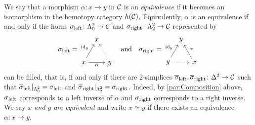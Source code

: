 \begin{numpar}\label{par:Equivalence}
	We say that a morphism $\alpha\colon x\rightarrow y$ in $\mathcal{C}$ is an \emph{equivalence} if it becomes an isomorphism in the homotopy category $h(\mathcal{C})$. Equivalently, $\alpha$ is an equivalence if and only if the horns $\sigma_\mathrm{left}\colon\Lambda_0^2\rightarrow\mathcal{C}$ and $\sigma_\mathrm{right}\colon\Lambda_2^2\rightarrow \mathcal{C}$ represented by\label{enum:Equivalence}
	\begin{equation*}
		\sigma_\mathrm{left}=\begin{tikzpicture}[commutative diagrams/every diagram,baseline=(mid.base)]
			\path node[outer sep=0.25ex] (0) at (0,0) {$x$} ++(0:3.8em) node[text depth=0pt,outer sep=0.25ex] (1) {$y$} ++ (120:3.8em) node[outer sep=0.25ex] (2) {$x$};
			\path (0) to node[pos=0.5] (mid) {} (2);
			\path[commutative diagrams/.cd, every arrow, every label]
			(0) edge node[swap] {$\alpha$} (1)
			(1) edge[dotted] (2)
			(0) edge node {$\id_y$} (2);
		\end{tikzpicture}
		\quad\text{and}\quad
		\sigma_\mathrm{right}=\begin{tikzpicture}[commutative diagrams/every diagram,baseline=(mid.base)]
			\path node[outer sep=0.25ex] (0) at (0,0) {$y$} ++(0:3.8em) node[text depth=0pt,outer sep=0.25ex] (1) {$x$} ++ (120:3.8em) node[outer sep=0.25ex] (2) {$y$};
			\path (0) to node[pos=0.5] (mid) {} (2);
			\path[commutative diagrams/.cd, every arrow, every label]
			(0) edge[dotted] (1)
			(1) edge node[swap] {$\alpha$} (2)
			(0) edge node {$\id_y$} (2);
		\end{tikzpicture}
	\end{equation*}
	can be filled, that is, if and only if there are $2$-simplices $\ov\sigma_\mathrm{left},\ov\sigma_\mathrm{right}\colon \Delta^2\rightarrow\Cc$ such that $\ov\sigma_\mathrm{left}|_{\Lambda_0^2}=\sigma_\mathrm{left}$ and $\ov\sigma_\mathrm{right}|_{\Lambda_2^2}=\sigma_\mathrm{right}$. Indeed, by \cref{par:Composition} above, $\ov\sigma_\mathrm{left}$ corresponds to a left inverse of $\alpha$ and $\ov\sigma_\mathrm{right}$ corresponds to a right inverse. We say \emph{$x$ and $y$ are equivalent} and write $x\simeq y$ if there exists an equivalence $\alpha\colon x\rightarrow y$.
\end{numpar}
